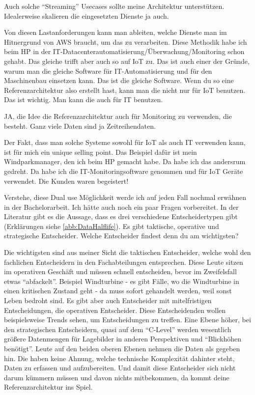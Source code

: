\LF Auch solche \enquote{Streaming} Usecases sollte meine Architektur unterstützen. Idealerweise skalieren die eingesetzten Dienste ja auch.

\PE Von diesen Lastanforderungen kann man ableiten, welche Dienste man im Hitnergrund von \ac{AWS} braucht, um das zu verarbeiten. Diese Methodik habe ich beim HP in der IT-Datacenterautomatisierung/Überwachung/Monitoring schon gehabt. Das gleiche trifft aber auch so auf \ac{IoT} zu. Das ist auch einer der Gründe, warum man die gleiche Software für IT-Automatisierung und für den Maschinenbau einsetzen kann. Das ist die gleiche Software. Wenn du so eine Referenzarchitektur also erstellt hast, kann man die nicht nur für \ac{IoT} benutzen. Das ist wichtig. Man kann die auch für IT benutzen.

\LF JA, die Idee die Referenzarchitektur auch für Monitoring zu verwenden, die besteht. Ganz viele Daten sind ja Zeitreihendaten.

\PE Der Fakt, dass man solche Systeme sowohl für \ac{IoT} als auch IT verwenden kann, ist für mich ein unique selling point. Das Beispiel dafür ist mein Windparkmanager, den ich beim HP gemacht habe. Da habe ich das andersrum gedreht. Da habe ich die IT-Monitoringsoftware genommen und für \ac{IoT} Geräte verwendet. Die Kunden waren begeistert! 

\LF Verstehe, diese Dual use Möglichkeit werde ich auf jeden Fall nochmal erwähnen in der Bachelorarbeit. Ich hätte auch noch ein paar Fragen vorbereitet. In der Literatur gibt es die Aussage, dass es drei verschiedene Entscheidertypen gibt (Erklärungen siehe \autoref{abb:DataHalflife}). Es gibt taktische, operative und strategische Entscheider. Welche Entscheider findest denn du am wichtigsten?

\PE Die wichtigsten sind aus meiner Sicht die taktischen Entscheider, welche wohl den fachlichen Entscheidern in den Fachabteilungen entsprechen. Diese Leute sitzen im operativen Geschäft und müssen schnell entscheiden, bevor im Zweifelsfall etwas \enquote{abfackelt}. Beispiel Windturbine - es gibt Fälle, wo die Windturbine in einen kritischen Zustand geht - da muss sofort gehandelt werden, weil sonst Leben bedroht sind. Es gibt aber auch Entscheider mit mitelfristigen Entscheidungen, die operativen Entscheider. Diese Entscheidenden wollen beispielsweise Trends sehen, um Entscheidungen zu treffen. Eine Ebene höher, bei den strategischen Entscheidern, quasi auf dem \enquote{C-Level} werden wesentlich größere Datenmengen für Lagebilder in anderen Perspektiven und \enquote{Blickhöhen benötigt}. Leute auf den beiden oberen Ebenen nehmen die Daten als gegeben hin. Die haben keine Ahnung, welche technische Komplexität dahinter steht, Daten zu erfassen und aufzubereiten. Und damit diese Entscheider sich nicht darum kümmern müssen und davon nichts mitbekommen, da kommt deine Referenzarchitektur ins Spiel. 

